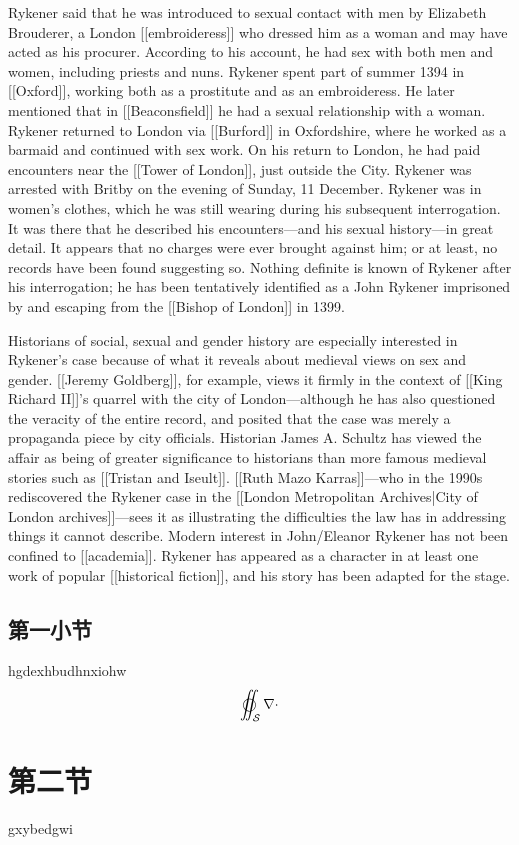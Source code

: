 \documentclass[11pt,a4paper,oneside]{article}
\newcommand{\csection}[1]{\section{\heiti\large #1}}
\newcommand{\csubsection}[1]{\subsection{\fangsong #1}}
\begin{document}
Rykener said that he was introduced to sexual contact with men by Elizabeth Brouderer, a London [[embroideress]] who dressed him as a woman and may have acted as his procurer. According to his account, he had sex with both men and women, including priests and nuns. Rykener spent part of summer 1394 in [[Oxford]], working both as a prostitute and as an embroideress. He later mentioned that in [[Beaconsfield]] he had a sexual relationship with a woman. Rykener returned to London via [[Burford]] in Oxfordshire, where he worked as a barmaid and continued with sex work. On his return to London, he had paid encounters near the [[Tower of London]], just outside the City. Rykener was arrested with Britby on the evening of Sunday, 11 December. Rykener was in women's clothes, which he was still wearing during his subsequent interrogation. It was there that he described his encounters—and his sexual history—in great detail. It appears that no charges were ever brought against him; or at least, no records have been found suggesting so. Nothing definite is known of Rykener after his interrogation; he has been tentatively identified as a John Rykener imprisoned by and escaping from the [[Bishop of London]] in 1399.

Historians of social, sexual and gender history are especially interested in Rykener's case because of what it reveals about medieval views on sex and gender. [[Jeremy Goldberg]], for example, views it firmly in the context of [[King Richard II]]'s quarrel with the city of London—although he has also questioned the veracity of the entire record, and posited that the case was merely a propaganda piece by city officials. Historian James A. Schultz has viewed the affair as being of greater significance to historians than more famous medieval stories such as [[Tristan and Iseult]]. [[Ruth Mazo Karras]]—who in the 1990s rediscovered the Rykener case in the [[London Metropolitan Archives|City of London archives]]—sees it as illustrating the difficulties the law has in addressing things it cannot describe. Modern interest in John/Eleanor Rykener has not been confined to [[academia]]. Rykener has appeared as a character in at least one work of popular [[historical fiction]], and his story has been adapted for the stage.

\csubsection{第一小节}
hgdexhbudhnxiohw
\[
\varoiint_\mathcal{S} \nabla\cdot 
\]
\csection{第二节}
gxybedgwi
\end{document}
